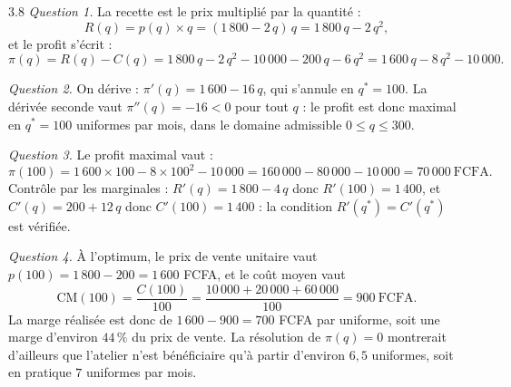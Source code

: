 \begin{corrige}{3.8}
\emph{Question 1.} La recette est le prix multiplié par la quantité :
\[
R(q) = p(q) \times q = (1\,800 - 2\,q)\,q = 1\,800\,q - 2\,q^{2},
\]
et le profit s'écrit :
\[
\pi(q) = R(q) - C(q) = 1\,800\,q - 2\,q^{2} - 10\,000 - 200\,q - 6\,q^{2} = 1\,600\,q - 8\,q^{2} - 10\,000.
\]

\emph{Question 2.} On dérive : $\pi'(q) = 1\,600 - 16\,q$, qui s'annule en $q^{*} = 100$. La dérivée seconde vaut $\pi''(q) = -16 < 0$ pour tout $q$ : le profit est donc maximal en $q^{*} = 100$ uniformes par mois, dans le domaine admissible $0 \leq q \leq 300$.

\emph{Question 3.} Le profit maximal vaut :
\[
\pi(100) = 1\,600 \times 100 - 8 \times 100^{2} - 10\,000 = 160\,000 - 80\,000 - 10\,000 = 70\,000 \ \text{FCFA}.
\]
Contrôle par les marginales : $R'(q) = 1\,800 - 4\,q$ donc $R'(100) = 1\,400$, et $C'(q) = 200 + 12\,q$ donc $C'(100) = 1\,400$ : la condition $R'(q^{*}) = C'(q^{*})$ est vérifiée.

\emph{Question 4.} À l'optimum, le prix de vente unitaire vaut $p(100) = 1\,800 - 200 = 1\,600$ FCFA, et le coût moyen vaut
\[
\mathrm{CM}(100) = \frac{C(100)}{100} = \frac{10\,000 + 20\,000 + 60\,000}{100} = 900 \ \text{FCFA}.
\]
La marge réalisée est donc de $1\,600 - 900 = 700$ FCFA par uniforme, soit une marge d'environ $44\,\%$ du prix de vente. La résolution de $\pi(q) = 0$ montrerait d'ailleurs que l'atelier n'est bénéficiaire qu'à partir d'environ $6{,}5$ uniformes, soit en pratique $7$ uniformes par mois.
\end{corrige}

